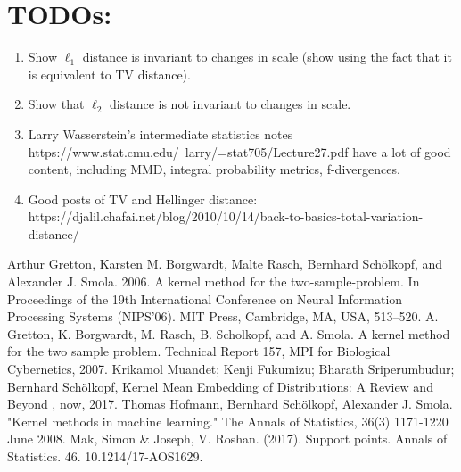 \documentclass[12pt]{article}
\begin{document}
\section{TODOs:}
\begin{enumerate}
\item Show $\ell_1$ distance is invariant to changes in scale (show using the fact that it is equivalent to TV distance). 
\item Show that $\ell_2$ distance is not invariant to changes in scale. 
\item Larry Wasserstein's intermediate statistics notes https://www.stat.cmu.edu/~larry/=stat705/Lecture27.pdf have a lot of good content, including MMD, integral probability metrics, f-divergences. 
\item Good posts of TV and Hellinger distance: https://djalil.chafai.net/blog/2010/10/14/back-to-basics-total-variation-distance/
\end{enumerate}

\begin{thebibliography}{20}
 Arthur Gretton, Karsten M. Borgwardt, Malte Rasch, Bernhard Schölkopf, and Alexander J. Smola. 2006. A kernel method for the two-sample-problem. In Proceedings of the 19th International Conference on Neural Information Processing Systems (NIPS'06). MIT Press, Cambridge, MA, USA, 513–520.
 A. Gretton, K. Borgwardt, M. Rasch, B. Scholkopf, and A. Smola. A kernel method for the two sample
problem. Technical Report 157, MPI for Biological Cybernetics, 2007.
 Krikamol Muandet; Kenji Fukumizu; Bharath Sriperumbudur; Bernhard Schölkopf, Kernel Mean Embedding of Distributions: A Review and Beyond , now, 2017.
 Thomas Hofmann, Bernhard Schölkopf, Alexander J. Smola. "Kernel methods in machine learning." The Annals of Statistics, 36(3) 1171-1220 June 2008.
 Mak, Simon \& Joseph, V. Roshan. (2017). Support points. Annals of Statistics. 46. 10.1214/17-AOS1629. 
\end{thebibliography}
\end{document}
